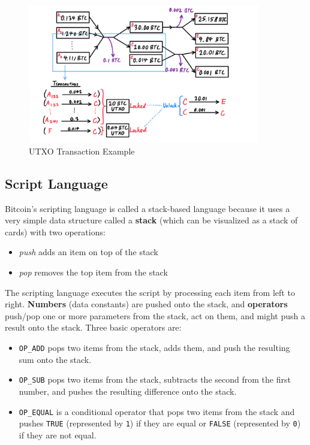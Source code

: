 \documentclass{article}
\begin{document}
    \begin{figure}[H]
    \centering
    \includegraphics[width=0.9\textwidth]{img/UTXO_transaction.png}
    \caption{UTXO Transaction Example}
    \end{figure}

  \subsection{Script Language}

    Bitcoin's scripting language is called a stack-based language because it uses a very simple data structure called a \textbf{stack} (which can be visualized as a stack of cards) with two operations:

    \begin{itemize}
      \item \textit{push} adds an item on top of the stack
      \item \textit{pop} removes the top item from the stack
    \end{itemize}

    The scripting language executes the script by processing each item from left to right. \textbf{Numbers} (data constants) are pushed onto the stack, and \textbf{operators} push/pop one or more parameters from the stack, act on them, and might push a result onto the stack. Three basic operators are:

    \begin{itemize}
      \item \texttt{OP\_ADD} pops two items from the stack, adds them, and push the resulting sum onto the stack.
      \item \texttt{OP\_SUB} pops two items from the stack, subtracts the second from the first number, and pushes the resulting difference onto the stack.
      \item \texttt{OP\_EQUAL} is a conditional operator that pops two items from the stack and pushes \texttt{TRUE} (represented by \texttt{1}) if they are equal or \texttt{FALSE} (represented by \texttt{0}) if they are not equal.
    \end{itemize}
\end{document}
